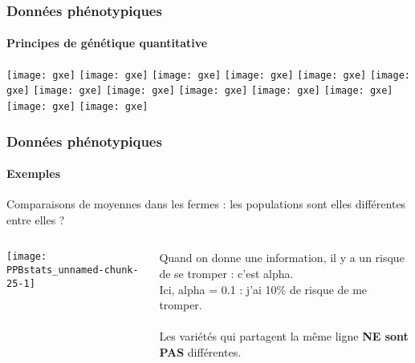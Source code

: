 \begin{frame}
\frametitle{Données phénotypiques}
\framesubtitle{Principes de génétique quantitative}

\begin{overprint}
\centering\texttt{[image: gxe]}
\centering\texttt{[image: gxe]}
\centering\texttt{[image: gxe]}
\centering\texttt{[image: gxe]} 
\centering\texttt{[image: gxe]} 
\centering\texttt{[image: gxe]} 
\centering\texttt{[image: gxe]} 
\centering\texttt{[image: gxe]} 
\centering\texttt{[image: gxe]} 
\centering\texttt{[image: gxe]} 
\centering\texttt{[image: gxe]} 
\centering\texttt{[image: gxe]} 
\centering\texttt{[image: gxe]} 
\end{overprint}

\end{frame}


\begin{frame}
\frametitle{Données phénotypiques}
\framesubtitle{Exemples}

Comparaisons de moyennes dans les fermes : les populations sont elles différentes entre elles ?

\begin{columns}

\begin{column}{.6\textwidth}
\begin{center}
\texttt{[image: PPBstats\_unnamed-chunk-25-1]} \tiny \cite{PPBstats_unnamed-chunk-25-1}
\end{center}
\end{column}

\begin{column}{.4\textwidth}
Quand on donne une information, il y a un risque de se tromper : c'est alpha.\\
Ici, alpha = 0.1 : j'ai 10\% de risque de me tromper.\\
~\\
Les variétés qui partagent la même ligne \textbf{NE sont PAS} différentes.
\end{column}

\end{columns}

\end{frame}


